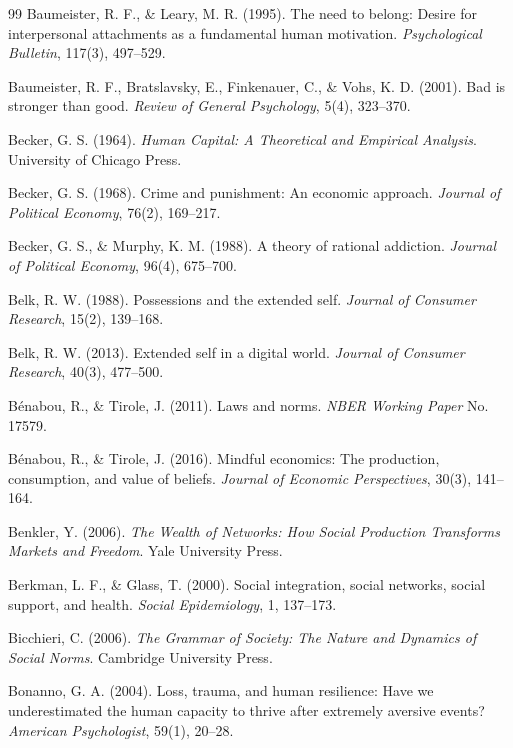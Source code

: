 \begin{thebibliography}{99}
Baumeister, R. F., \& Leary, M. R. (1995).
The need to belong: Desire for interpersonal attachments as a fundamental human motivation.
\textit{Psychological Bulletin}, 117(3), 497--529.

Baumeister, R. F., Bratslavsky, E., Finkenauer, C., \& Vohs, K. D. (2001).
Bad is stronger than good.
\textit{Review of General Psychology}, 5(4), 323--370.

Becker, G. S. (1964).
\textit{Human Capital: A Theoretical and Empirical Analysis}.
University of Chicago Press.

Becker, G. S. (1968).
Crime and punishment: An economic approach.
\textit{Journal of Political Economy}, 76(2), 169--217.

Becker, G. S., \& Murphy, K. M. (1988).
A theory of rational addiction.
\textit{Journal of Political Economy}, 96(4), 675--700.

Belk, R. W. (1988).
Possessions and the extended self.
\textit{Journal of Consumer Research}, 15(2), 139--168.

Belk, R. W. (2013).
Extended self in a digital world.
\textit{Journal of Consumer Research}, 40(3), 477--500.

Bénabou, R., \& Tirole, J. (2011).
Laws and norms.
\textit{NBER Working Paper} No. 17579.

Bénabou, R., \& Tirole, J. (2016).
Mindful economics: The production, consumption, and value of beliefs.
\textit{Journal of Economic Perspectives}, 30(3), 141--164.

Benkler, Y. (2006).
\textit{The Wealth of Networks: How Social Production Transforms Markets and Freedom}.
Yale University Press.

Berkman, L. F., \& Glass, T. (2000).
Social integration, social networks, social support, and health.
\textit{Social Epidemiology}, 1, 137--173.

Bicchieri, C. (2006).
\textit{The Grammar of Society: The Nature and Dynamics of Social Norms}.
Cambridge University Press.

Bonanno, G. A. (2004).
Loss, trauma, and human resilience: Have we underestimated the human capacity to thrive after extremely aversive events?
\textit{American Psychologist}, 59(1), 20--28.


\end{thebibliography}
